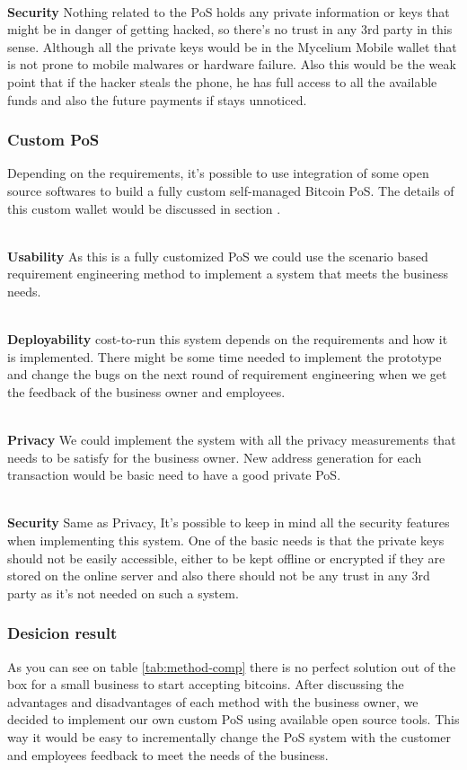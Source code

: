 \\ \textbf{Security}
Nothing related to the PoS holds any private information or keys that might be in danger of getting hacked, so there's no trust in any 3rd party in this sense. Although all the private keys would be in the Mycelium Mobile wallet that is not prone to mobile malwares or hardware failure. Also this would be the weak point that if the hacker steals the phone, he has full access to all the available funds and also the future payments if stays unnoticed.

\subsubsection{Custom PoS}
Depending on the requirements, it's possible to use integration of some open source softwares to build a fully custom self-managed Bitcoin PoS. The details of this custom wallet would be discussed in section .

\\ \textbf{Usability}
As this is a fully customized PoS we could use the scenario based requirement engineering method to implement a system that meets the business needs.

\\ \textbf{Deployability}
cost-to-run this system depends on the requirements and how it is implemented. There might be some time needed to implement the prototype and change the bugs on the next round of requirement engineering when we get the feedback of the business owner and employees.

\\ \textbf{Privacy}
We could implement the system with all the privacy measurements that needs to be satisfy for the business owner. New address generation for each transaction would be basic need to have a good private PoS.

\\ \textbf{Security}
Same as Privacy, It's possible to keep in mind all the security features when implementing this system. One of the basic needs is that the private keys should not be easily accessible, either to be kept offline or encrypted if they are stored on the online server and also there should not be any trust in any 3rd party as it's not needed on such a system.

\subsubsection{Desicion result}
As you can see on table \ref{tab:method-comp} there is no perfect solution out of the box for a small business to start accepting bitcoins. After discussing the advantages and disadvantages of each method with the business owner, we decided to implement our own custom PoS using available open source tools. This way it would be easy to incrementally change the PoS system with the customer and employees feedback to meet the needs of the business.

